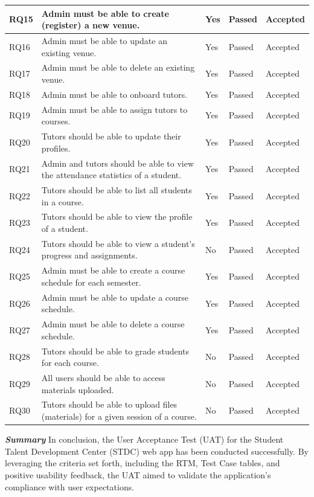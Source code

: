 \begin{justify}
\begin{longtable}[c]{|p{1.5cm}|p{5cm}|p{1.75cm}|p{2.5cm}|p{2.5cm}|}
\hline
RQ15 & Admin must be able to create (register) a new venue. & Yes & Passed & Accepted \\
\hline
RQ16 & Admin must be able to update an existing venue. & Yes & Passed & Accepted \\
\hline
RQ17 & Admin must be able to delete an existing venue. & Yes & Passed & Accepted \\
\hline
RQ18 & Admin must be able to onboard tutors. & Yes & Passed & Accepted \\
\hline
RQ19 & Admin must be able to assign tutors to courses. & Yes & Passed & Accepted \\
\hline
RQ20 & Tutors should be able to update their profiles. & Yes & Passed & Accepted \\
\hline
RQ21 & Admin and tutors should be able to view the attendance statistics of a student. & Yes & Passed & Accepted \\
\hline
RQ22 & Tutors should be able to list all students in a course. & Yes & Passed & Accepted \\
\hline
RQ23 & Tutors should be able to view the profile of a student. & Yes & Passed & Accepted \\
\hline
RQ24 & Tutors should be able to view a student's progress and assignments. & No & Passed & Accepted \\
\hline
RQ25 & Admin must be able to create a course schedule for each semester. & Yes & Passed & Accepted \\
\hline
RQ26 & Admin must be able to update a course schedule. & Yes & Passed & Accepted \\
\hline
RQ27 & Admin must be able to delete a course schedule. & Yes & Passed & Accepted \\
\hline
RQ28 & Tutors should be able to grade students for each course. & No & Passed & Accepted\\
\hline
RQ29 & All users should be able to access materials uploaded. & No & Passed & Accepted\\
\hline
RQ30 & Tutors should be able to upload files (materials) for a given session of a course. & No & Passed & Accepted \\
\hline
\end{longtable}


\vspace{0.5cm}
\newendline \textbf{\textit{Summary}}\newendline
In conclusion, the User Acceptance Test (UAT) for the Student Talent Development Center (STDC) web app has been conducted successfully. By leveraging the criteria set forth, including the RTM, Test Case tables, and positive usability feedback, the UAT aimed to validate the application's compliance with user expectations.


\end{justify}
